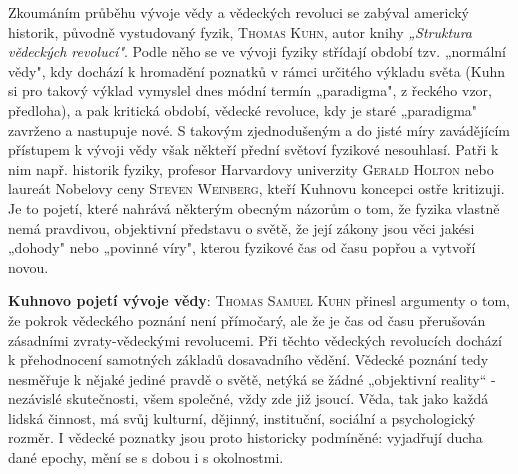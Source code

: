       Zkoumáním průběhu vývoje vědy a vědeckých revoluci se zabýval americký historik, původně
      vystudovaný fyzik, \textsc{Thomas Kuhn}, autor knihy \emph{„Struktura vědeckých revolucí"}.
      Podle něho se ve vývoji fyziky střídají období tzv. „normální vědy", kdy dochází k hromadění
      poznatků v rámci určitého výkladu světa (Kuhn si pro takový výklad vymyslel dnes módní termín
      „paradigma", z řeckého vzor, předloha), a pak kritická období, vědecké revoluce, kdy je staré
      „paradigma" zavrženo a nastupuje nové. S takovým zjednodušeným a do jisté míry zavádějícím
      přístupem k vývoji vědy však někteří přední světoví fyzikové nesouhlasí. Patři k nim např.
      historik fyziky, profesor Harvardovy univerzity \textsc{Gerald Holton} nebo laureát Nobelovy
      ceny \textsc{Steven Weinberg}, kteří Kuhnovu koncepci ostře kritizuji. Je to pojetí, které
      nahrává některým obecným názorům o tom, že fyzika vlastně nemá pravdivou, objektivní představu
      o světě, že její zákony jsou věci jakési „dohody" nebo „povinné víry", kterou fyzikové čas od
      času popřou a vytvoří novou.

      \begin{tcnote}
        \textbf{Kuhnovo pojetí vývoje vědy}: \textsc{Thomas Samuel Kuhn} přinesl argumenty o tom,
        že pokrok vědeckého poznání není přímočarý, ale že je čas od času přerušován zásadními
        zvraty-vědeckými revolucemi. Při těchto vědeckých revolucích dochází k přehodnocení
        samotných základů dosavadního vědění. Vědecké poznání tedy nesměřuje k nějaké jediné
        pravdě o světě, netýká se žádné „objektivní reality“ - nezávislé skutečnosti, všem
        společné, vždy zde již jsoucí. Věda, tak jako každá lidská činnost, má svůj kulturní,
        dějinný, instituční, sociální a psychologický rozměr. I vědecké poznatky jsou proto
        historicky podmíněné: vyjadřují ducha dané epochy, mění se s dobou i s okolnostmi.
        
        \vspace{1em}
        {\centering
        \captionsetup{type=figure} 
        \label{fyz:fig0893}
      \par}
      \end{tcnote}

